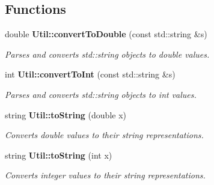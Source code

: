 \subsection*{Functions}
\begin{CompactItemize}
\item 
double {\bf Util::convertToDouble} (const std::string \&s)
\begin{CompactList}\small\item\em Parses and converts std::string objects to double values. \item\end{CompactList}\item 
int {\bf Util::convertToInt} (const std::string \&s)
\begin{CompactList}\small\item\em Parses and converts std::string objects to int values. \item\end{CompactList}\item 
string {\bf Util::toString} (double x)
\begin{CompactList}\small\item\em Converts double values to their string representations. \item\end{CompactList}\item 
string {\bf Util::toString} (int x)
\begin{CompactList}\small\item\em Converts integer values to their string representations. \item\end{CompactList}\end{CompactItemize}
